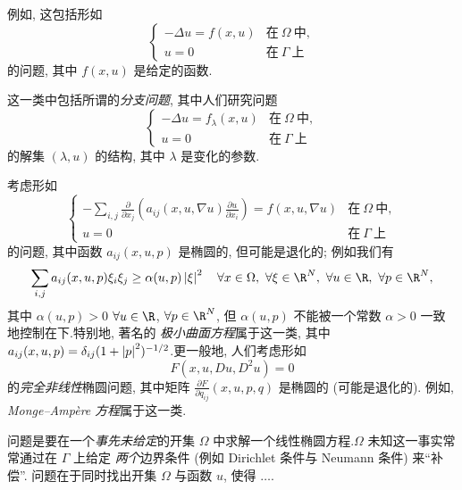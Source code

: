  例如, 这包括形如
\begin{equation}
\begin{cases}
-\Delta u=f(x,u) & \text{在}\ \Omega\ \text{中},\\
u=0 & \text{在}\ \Gamma\ \text{上}
\end{cases}
\label{eq:9.92}
\end{equation}
的问题, 其中 $f(x,u)$ 是给定的函数.

这一类中包括所谓的\emph{分支问题}, 其中人们研究问题
\begin{equation*}
\begin{cases}
-\Delta u=f_\lambda(x,u) & \text{在}\ \Omega\ \text{中},\\
u=0 & \text{在}\ \Gamma\ \text{上}
\end{cases}
\tag*{(91$'$)}
\end{equation*}
的解集 $(\lambda,u)$ 的结构, 其中 $\lambda$ 是变化的参数.

 考虑形如
\begin{equation}
\begin{cases}
\displaystyle-\sum_{i,j}\frac{\partial}{\partial x_j}
\left(a_{ij}(x,u,\nabla u)\frac{\partial u}{\partial x_i}\right)
=f(x,u,\nabla u) & \text{在}\ \Omega\ \text{中},\\[2mm]
u=0 & \text{在}\ \Gamma\ \text{上}
\end{cases}
\label{eq:9.93}
\end{equation}
的问题, 其中函数 $a_{ij}(x,u,p)$ 是椭圆的, 但可能是退化的; 例如我们有
\begin{equation*}
\sum_{i,j}a_{ij}(x,u,p)\xi_i\xi_j\ge\alpha(u,p)\abs{\xi}^2
\quad\forall x\in\Omega,\ \forall\xi\in\R^N,\ \forall u\in\R,\
\forall p\in\R^N,
\end{equation*}
其中 $\alpha(u,p)>0$ $\forall u\in\R$, $\forall p\in\R^N$, 但
$\alpha(u,p)$ 不能被一个常数 $\alpha>0$ 一致地控制在下.特别地, 著名的
\emph{极小曲面方程}属于这一类, 其中
$a_{ij}(x,u,p)=\delta_{ij}(1+\left|p\right|^2)^{-1/2}$.更一般地, 人们考虑形如
\begin{equation}
F(x,u,Du,D^2u)=0
\label{eq:9.94}
\end{equation}
的\emph{完全非线性}椭圆问题, 其中矩阵
$\frac{\partial F}{\partial q_{ij}}(x,u,p,q)$ 是椭圆的 (可能是退化的).
例如, \emph{Monge--Amp\`ere 方程}属于这一类.

 问题是要在一个\emph{事先未给定}的开集 $\Omega$
中求解一个线性椭圆方程.$\Omega$ 未知这一事实常常通过在 $\Gamma$ 上给定
\emph{两个}边界条件 (例如 Dirichlet 条件与 Neumann 条件) 来``补偿''.
问题在于同时找出开集 $\Omega$ 与函数 $u$, 使得 $\ldots$.

